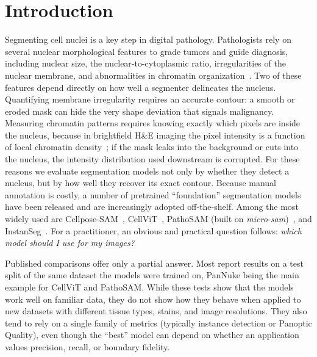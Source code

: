 \documentclass[10pt,conference]{IEEEtran}
\begin{document}
\section{Introduction}
\label{sec:intro}
Segmenting cell nuclei is a key step in digital pathology. Pathologists rely on several nuclear
morphological features to grade tumors and guide diagnosis, including nuclear size, the
nuclear-to-cytoplasmic ratio, irregularities of the nuclear membrane, and abnormalities in
chromatin organization~\cite{shifaterabbi2025}. Two of these features depend directly on how
well a segmenter delineates the nucleus. Quantifying membrane irregularity requires an accurate
contour: a smooth or eroded mask can hide the very shape deviation that signals malignancy.
Measuring chromatin patterns requires knowing exactly which pixels are inside the nucleus,
because in brightfield H\&E imaging the pixel intensity is a function of local chromatin
density~\cite{shifaterabbi2025}; if the mask leaks into the background or cuts into the
nucleus, the intensity distribution used downstream is corrupted. For these reasons we evaluate
segmentation models not only by whether they detect a nucleus, but by how well they recover its
exact contour.
Because manual annotation is costly,
a number of pretrained ``foundation'' segmentation models have been released and
are increasingly adopted off-the-shelf. Among the most widely used are
Cellpose-SAM~\cite{cellposesam}, CellViT~\cite{cellvit}, PathoSAM (built on
\emph{micro-sam})~\cite{microsam}, and InstanSeg~\cite{instanseg}. For a
practitioner, an obvious and practical question follows: \emph{which model should
I use for my images?}

Published comparisons offer only a partial answer. Most report results on a
test split of the same dataset the models were trained on, PanNuke being the main
example for CellViT and PathoSAM. While these tests show that the models work well on
familiar data, they do not show how they behave when applied to new datasets with different
tissue types, stains, and image resolutions. They also tend to rely on a single family of metrics (typically
instance detection or Panoptic Quality), even though the ``best'' model can depend
on whether an application values precision, recall, or boundary fidelity.
\end{document}
